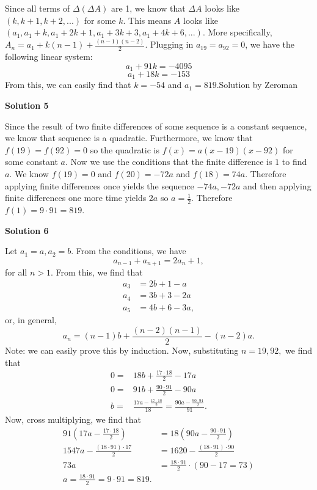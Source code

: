 \begin{enumerate}
Since all terms of $\Delta(\Delta A)$ are 1, we know that $\Delta A$ looks like $(k,k+1,k+2,...)$ for some $k$. This means $A$ looks like $(a_1,a_1+k,a_1+2k+1,a_1+3k+3,a_1+4k+6,...)$. More specifically, $A_n=a_1+k(n-1)+\frac{(n-1)(n-2)}{2}$. Plugging in $a_{19}=a_{92}=0$, we have the following linear system: 
 \[a_1+91k=-4095\] 
 \[a_1+18k=-153\] From this, we can easily find that $k=-54$ and $a_1=\boxed{819}$.Solution by Zeroman

 


 



\textbf{Solution 5}

Since the result of two finite differences of some sequence is a constant sequence, we know that sequence is a quadratic. Furthermore, we know that $f(19) = f(92) = 0$ so the quadratic is $f(x) = a(x-19)(x-92)$ for some constant $a.$ Now we use the conditions that the finite difference is $1$ to find $a.$ We know $f(19) = 0$ and $f(20) = -72a$ and $f(18) = 74a.$ Therefore applying finite differences once yields the sequence $-74a,-72a$ and then applying finite differences one more time yields $2a$ so $a =\frac{1}{2}.$ Therefore $f(1) = 9 \cdot 91 = \boxed{819}.$




\textbf{Solution 6}

Let $a_1=a,a_2=b.$ From the conditions, we have 
 \[a_{n-1}+a_{n+1}=2a_n+1,\] for all $n>1.$ From this, we find that 
 \begin{align*} a_3&=2b+1-a \\ a_4&=3b+3-2a\\ a_5&=4b+6-3a, \end{align*}
or, in general, 
 \[a_n=(n-1)b+\frac{(n-2)(n-1)}{2}-(n-2)a.\] Note: we can easily prove this by induction. Now, substituting $n=19,92,$ we find that 
 \begin{align*} 0=&18b+\frac{17\cdot18}{2}-17a\\ 0=&91b+\frac{90\cdot91}{2}-90a\\ b=&\frac{17a-\frac{17\cdot18}{2}}{18}=\frac{90a-\frac{90\cdot91}{2}}{91}. \end{align*}
Now, cross multiplying, we find that
 \begin{align*} 91\left(17a-\frac{17\cdot18}{2}\right)&=18\left(90a-\frac{90\cdot91}{2}\right)\\ 1547a-\frac{(18\cdot91)\cdot17}{2}&=1620-\frac{(18\cdot91)\cdot90}{2}\\ 73a&=\frac{18\cdot91}{2}\cdot(90-17=73)\\ a=\frac{18\cdot91}{2}=9\cdot91=\boxed{819}. \end{align*}





\end{enumerate}
